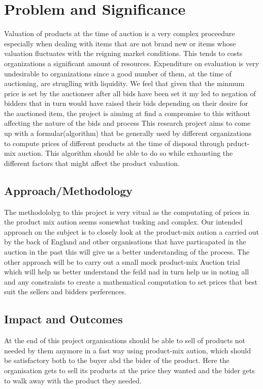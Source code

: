 \documentclass[11pt]{article} %
\begin{document}
\section{Problem and Significance}
Valuation of products at the time of auction is a very complex proceedure especially when dealing with items that are not brand new or items whose valuation fluctuates with the reigning market conditions. This tends to costs organizations a significant amount of resources.
Expenditure on evaluation is very undesirable to organizations since a good number of them, at the time of auctioning, are struglling with liquidity.
We feel that given that the minmum price is set by the auctioneer after all bids have been set it my led to negation of bidders that in turn would have raised their bids depending on their desire for the auctioned item, the project is aimimg at find a compromise to this without affecting the nature of the bids and process 
This research project aims to come up with a formular(algorithm) that be generally used by different organizations to compute prices of different products at the time of disposal through prduct-mix auction. This algorithm should be able to do so while exhausting the different factors that might affect the product valuation.

\subsection{Approach/Methodology} 
The methodololyg to this project is very vitual as the computating of prices in the product mix aution seems somewhat tusking and complex. 
Our intended approach on the subject is to closely look at the product-mix aution a  carried out by the back of England and other organisations that have particapated in the auction in the past this will give us a better understanding of the process. 
The other approach will be to carry out a small mock product-mix Auction trial which will help us better understand the feild nad in turn help us in noting all and any constraints to create a mathematical computation to set prices that best suit the sellers and bidders perferences.


\subsection{Impact and Outcomes}
At the end of this project organisations should be able to sell of products not needed by them anymore in a fast way using product-mix aution, which should be satisfactory both to the buyer abd the bider of the product. Here the organisation gets to sell its products at the price they wanted and the bider gets to walk away with the product they needed.
\end{document}
